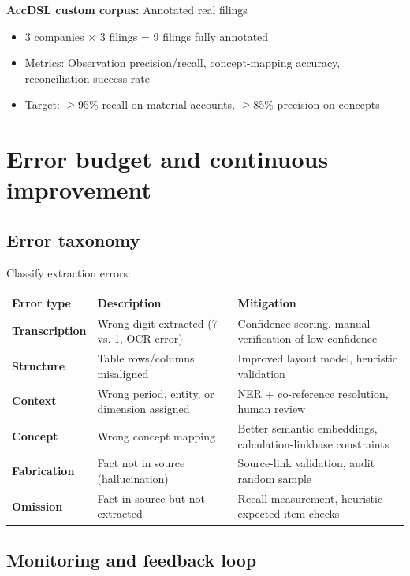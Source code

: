 \textbf{AccDSL custom corpus:} Annotated real filings
\begin{itemize}
\item 3 companies $\times$ 3 filings = 9 filings fully annotated
\item Metrics: Observation precision/recall, concept-mapping accuracy, reconciliation success rate
\item Target: $\geq$95\% recall on material accounts, $\geq$85\% precision on concepts
\end{itemize}

\section{Error budget and continuous improvement}

\subsection{Error taxonomy}

Classify extraction errors:

\begin{longtable}{L{30mm}L{50mm}L{56mm}}
\toprule Error type & Description & Mitigation\\\midrule\endhead
\textbf{Transcription} & Wrong digit extracted (7 vs. 1, OCR error) &
Confidence scoring, manual verification of low-confidence\\
\textbf{Structure} & Table rows/columns misaligned & Improved layout model, heuristic validation\\
\textbf{Context} & Wrong period, entity, or dimension assigned & NER + co-reference
resolution, human review\\
\textbf{Concept} & Wrong concept mapping & Better semantic embeddings, calculation-linkbase
constraints\\
\textbf{Fabrication} & Fact not in source (hallucination) & Source-link validation,
audit random sample\\
\textbf{Omission} & Fact in source but not extracted & Recall measurement, heuristic
expected-item checks\\\bottomrule
\end{longtable}

\subsection{Monitoring and feedback loop}

